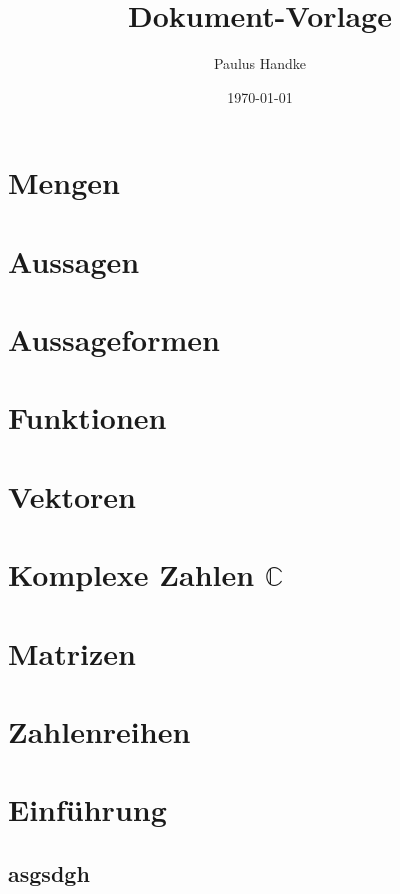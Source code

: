 \documentclass{article}
\title{Dokument-Vorlage}
\date{\today}
\author{Paulus Handke}
\begin{document}
\normalfont
{}
\maketitle
\newpage
\tableofcontents
{}
\newpage


\section{Mengen}




\section{Aussagen}

\section{Aussageformen}
\section{Funktionen}

\section{Vektoren}

\newpage
\section{Komplexe Zahlen $\mathbb{C}$}

\section{Matrizen}

\section{Zahlenreihen}


\section{Einführung}
\subsection{asgsdgh}
\end{document}
